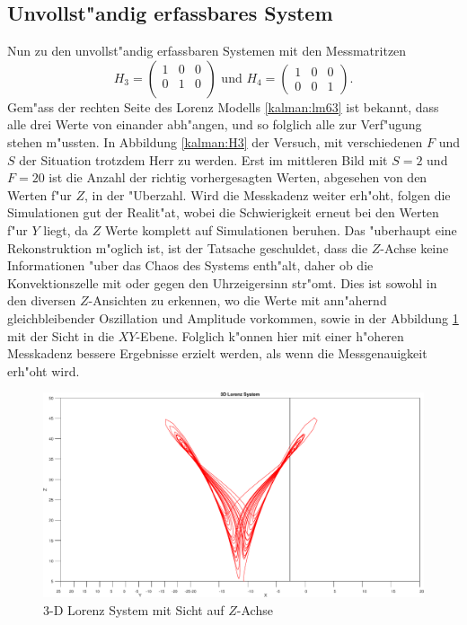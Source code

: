 \begin{refsection}
\subsection{Unvollst"andig erfassbares System}
Nun zu den unvollst"andig erfassbaren Systemen mit den Messmatritzen 
\[H_{3}=\begin{pmatrix}
1 & 0 & 0 \\ 
0 & 1 & 0 \\ 
\end{pmatrix} 
\text{ und }
H_{4}=\begin{pmatrix}
1 & 0 & 0 \\ 
0 & 0 & 1
\end{pmatrix}
\text{.}
\]
Gem"ass der rechten Seite des Lorenz Modells \eqref{kalman:lm63} ist bekannt, dass alle drei Werte von einander abh"angen, und so folglich alle zur Verf"ugung stehen m"ussten. In Abbildung \ref{kalman:H3} der Versuch, mit verschiedenen $F$ und $S$ der Situation trotzdem Herr zu werden. Erst im mittleren Bild mit $S=2$ und $F=20$ ist die Anzahl der richtig vorhergesagten Werten, abgesehen von den Werten f"ur $Z$, in der "Uberzahl. Wird die Messkadenz weiter erh"oht, folgen die Simulationen gut der Realit"at, wobei die Schwierigkeit erneut bei den Werten f"ur $Y$ liegt, da $Z$ Werte komplett auf Simulationen beruhen. Das "uberhaupt eine Rekonstruktion m"oglich ist, ist der Tatsache geschuldet, dass die $Z$-Achse keine Informationen "uber das Chaos des Systems enth"alt, daher ob die Konvektionszelle mit oder gegen den Uhrzeigersinn str"omt. Dies ist sowohl in den diversen $Z$-Ansichten zu erkennen, wo die Werte mit ann"ahernd gleichbleibender Oszillation und Amplitude vorkommen, sowie in der Abbildung \ref{kalman:zview} mit der Sicht in die $XY$-Ebene.
Folglich k"onnen hier mit einer h"oheren Messkadenz bessere Ergebnisse erzielt werden, als wenn die Messgenauigkeit erh"oht wird.

\begin{figure}
\centering
\includegraphics[width=\hsize]{kalman/figures/zview.pdf}
\caption{3-D Lorenz System mit Sicht auf $Z$-Achse}
\label{kalman:zview}
\end{figure}


\end{refsection}
